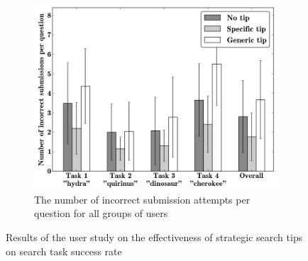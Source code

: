 \begin{figure}[h]
\begin{subfigure}{0.32\textwidth}
  \centering
  \includegraphics[width=\textwidth]{img/incorrect}
  \caption{The number of incorrect submission attempts per question for all groups of users}
  \label{figure:hints:incorrect}
  \end{subfigure}
\caption{Results of the user study on the effectiveness of strategic search tips on search task success rate}
\label{fig:hints:results}
\end{figure}

